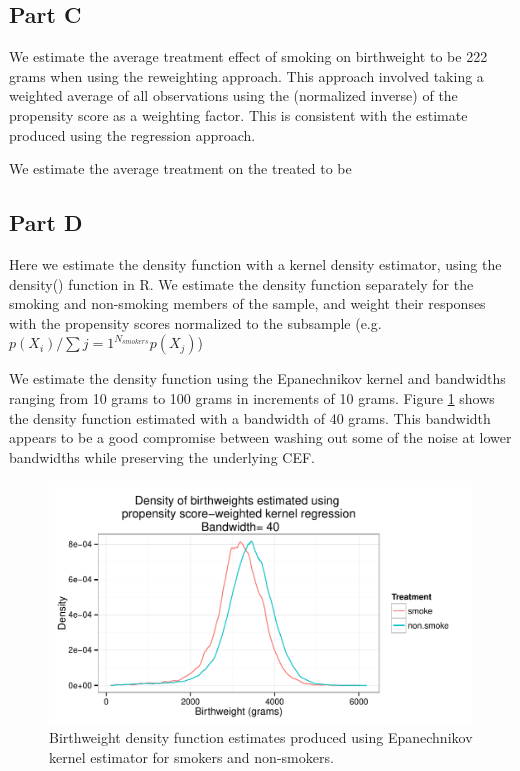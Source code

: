 \documentclass[letterpaper, 12pt]{article}
\begin{document}
\subsection{Part C}

We estimate the average treatment effect of smoking on birthweight to be 222 grams when using the reweighting approach. This approach involved taking a weighted average of all observations using the (normalized inverse) of the propensity score as a weighting factor. This is consistent with the estimate produced using the regression approach.

We estimate the average treatment on the treated to be %

\subsection{Part D}
Here we estimate the density function with a kernel density estimator, using the density() function in R. We estimate the density function separately for the smoking and non-smoking members of the sample, and weight their responses with the propensity scores normalized to the subsample (e.g. $p(X_i)/\sum\limits{j=1}^{N_{smokers}}p(X_j)$)

We estimate the density function using the Epanechnikov kernel and bandwidths ranging from 10 grams to 100 grams in increments of 10 grams. Figure \ref{fig:kernel40} shows the density function estimated with a bandwidth of 40 grams. This bandwidth appears to be a good compromise between washing out some of the noise at lower bandwidths while preserving the underlying CEF. 

\begin{figure}[h!]
   \centering
   \includegraphics[width=6in]{img/kerndensity40.pdf} 
   \caption{Birthweight density function estimates produced using Epanechnikov kernel estimator for smokers and non-smokers.}
   \label{fig:kernel40}
\end{figure}
\end{document}
